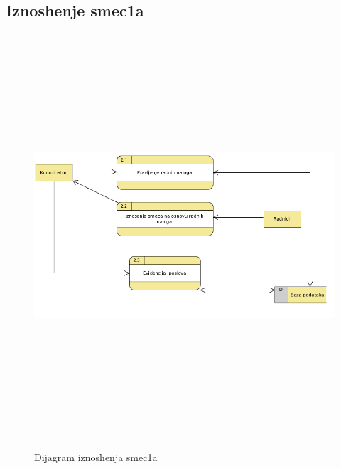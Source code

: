 \documentclass[10 pt]{article}
\begin{document}

	\subsection{Iznoshenje smec1a}
	
	\begin{figure}[H]
		\centering
		\includegraphics[width=15cm,height=15cm,keepaspectratio]{slike/IznosenjeSmeca.png}\\
		\caption{Dijagram iznoshenja smec1a}
	\end{figure}
	
\end{document}
